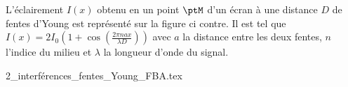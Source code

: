 



\hauteurLargeurCadreReponse		{6mm}{5cm}
\initialisationEntrainement

                                \initialisationPartieGauche %
L'éclairement $I(x)$ obtenu en un point $\ptM$ d'un écran à une distance $D$ de fentes d'Young est représenté sur la figure ci contre. Il est tel que $I(x)=2I_0 \left(1+\cos\left(\frac{2\pi nax}{\lambda D}\right)\right)$ avec $a$ la distance entre les deux fentes, $n$ l'indice du milieu et $\lambda$ la longueur d'onde du signal.

                                \initialisationPartieDroite %
\begin{center}
	{2_interférences_fentes_Young_FBA.tex}
\end{center}
                               \finalisationDuPartageDePage %





